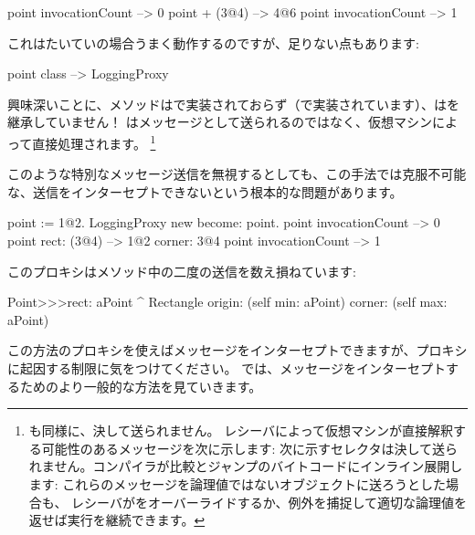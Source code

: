 \documentclass[a4paper,10pt,twoside]{book}
\begin{document}
\begin{code}{}
point invocationCount --> 0
point + (3@4)             --> 4@6
point invocationCount --> 1
\end{code}

これはたいていの場合うまく動作するのですが、足りない点もあります:
\begin{code}{}
point class --> LoggingProxy
\end{code}
興味深いことに、メソッドはで実装されておらず（で実装されています）、はを継承していません！
はメッセージとして送られるのではなく、仮想マシンによって直接処理されます。
\footnote{も同様に、決して送られません。
レシーバによって仮想マシンが直接解釈する可能性のあるメッセージを次に示します:
\ct{+- < > <= >= = ~= * / \ ==}
次に示すセレクタは決して送られません。コンパイラが比較とジャンプのバイトコードにインライン展開します:
これらのメッセージを論理値ではないオブジェクトに送ろうとした場合も、
レシーバがをオーバーライドするか、例外を捕捉して適切な論理値を返せば実行を継続できます。
}%

このような特別なメッセージ送信を無視するとしても、この手法では克服不可能な、\self 送信をインターセプトできないという根本的な問題があります。
\begin{code}{}
point := 1@2.
LoggingProxy new become: point.
point invocationCount --> 0
point rect: (3@4)        --> 1@2 corner: 3@4
point invocationCount --> 1
\end{code}

このプロキシはメソッド中の二度の\self 送信を数え損ねています:
\begin{code}{}
Point>>>rect: aPoint 
	^ Rectangle  origin: (self min: aPoint) corner: (self max: aPoint)
\end{code}

この方法のプロキシを使えばメッセージをインターセプトできますが、プロキシに起因する制限に気をつけてください。
では、メッセージをインターセプトするためのより一般的な方法を見ていきます。

\end{document}

